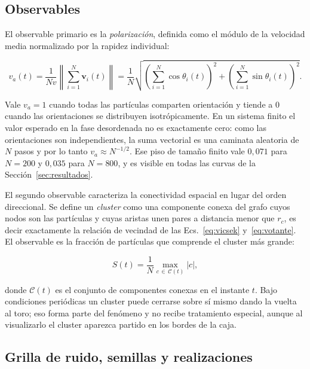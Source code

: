 \documentclass[11pt]{article}
\newcommand{\vect}[1]{\mathbf{#1}}
\begin{document}
\subsection{Observables}
\label{sec:observables}

El observable primario es la \emph{polarización}, definida como el módulo de la
velocidad media normalizado por la rapidez individual:

\begin{equation}
  v_a(t) = \frac{1}{N v}
    \left\| \sum_{i=1}^{N} \vect{v}_i(t) \right\|
  = \frac{1}{N} \sqrt{
    \left( \sum_{i=1}^{N} \cos\theta_i(t) \right)^{\!2}
    + \left( \sum_{i=1}^{N} \sin\theta_i(t) \right)^{\!2} } .
  \label{eq:polarizacion}
\end{equation}

Vale $v_a = 1$ cuando todas las partículas comparten orientación y tiende a $0$
cuando las orientaciones se distribuyen isotrópicamente. En un sistema finito el
valor esperado en la fase desordenada no es exactamente cero: como las
orientaciones son independientes, la suma vectorial es una caminata aleatoria de
$N$ pasos y por lo tanto $v_a \approx N^{-1/2}$. Ese piso de tamaño finito vale
$0{,}071$ para $N = 200$ y $0{,}035$ para $N = 800$, y es visible en todas las
curvas de la Sección~\ref{sec:resultados}.

El segundo observable caracteriza la conectividad espacial en lugar del orden
direccional. Se define un \emph{cluster} como una componente conexa del grafo
cuyos nodos son las partículas y cuyas aristas unen pares a distancia menor que
$r_c$, es decir exactamente la relación de vecindad de las
Ecs.~\eqref{eq:vicsek} y~\eqref{eq:votante}. El observable es la fracción de
partículas que comprende el cluster más grande:

\begin{equation}
  S(t) = \frac{1}{N} \max_{c \,\in\, \mathcal{C}(t)} |c| ,
  \label{eq:componente-gigante}
\end{equation}

donde $\mathcal{C}(t)$ es el conjunto de componentes conexas en el instante $t$.
Bajo condiciones periódicas un cluster puede cerrarse sobre sí mismo dando la
vuelta al toro; eso forma parte del fenómeno y no recibe tratamiento especial,
aunque al visualizarlo el cluster aparezca partido en los bordes de la caja.

\subsection{Grilla de ruido, semillas y realizaciones}
\label{sec:grilla-semillas}
\end{document}
